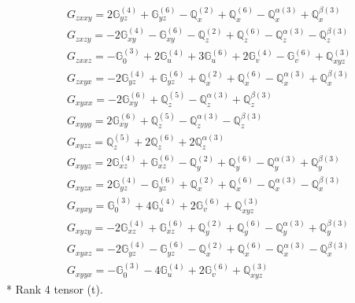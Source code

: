 \documentclass[fleqn,8pt,landscape]{jsarticle}
\begin{document}
\begin{align*}
& G_{zxxy} = 2 \mathbb{G}_{yz}^{(4)} + \mathbb{G}_{yz}^{(6)} - \mathbb{Q}_{x}^{(2)} + \mathbb{Q}_{x}^{(6)} - \mathbb{Q}_{x}^{\alpha(3)} + \mathbb{Q}_{x}^{\beta(3)} \\
& G_{zxzy} = - 2 \mathbb{G}_{xy}^{(4)} - \mathbb{G}_{xy}^{(6)} - \mathbb{Q}_{z}^{(2)} + \mathbb{Q}_{z}^{(6)} - \mathbb{Q}_{z}^{\alpha(3)} - \mathbb{Q}_{z}^{\beta(3)} \\
& G_{zxxz} = - \mathbb{G}_{0}^{(3)} + 2 \mathbb{G}_{u}^{(4)} + 3 \mathbb{G}_{u}^{(6)} + 2 \mathbb{G}_{v}^{(4)} - \mathbb{G}_{v}^{(6)} + \mathbb{Q}_{xyz}^{(3)} \\
& G_{zxyx} = - 2 \mathbb{G}_{yz}^{(4)} + \mathbb{G}_{yz}^{(6)} + \mathbb{Q}_{x}^{(2)} + \mathbb{Q}_{x}^{(6)} - \mathbb{Q}_{x}^{\alpha(3)} + \mathbb{Q}_{x}^{\beta(3)} \\
& G_{xyxx} = - 2 \mathbb{G}_{xy}^{(6)} + \mathbb{Q}_{z}^{(5)} - \mathbb{Q}_{z}^{\alpha(3)} + \mathbb{Q}_{z}^{\beta(3)} \\
& G_{xyyy} = 2 \mathbb{G}_{xy}^{(6)} + \mathbb{Q}_{z}^{(5)} - \mathbb{Q}_{z}^{\alpha(3)} - \mathbb{Q}_{z}^{\beta(3)} \\
& G_{xyzz} = \mathbb{Q}_{z}^{(5)} + 2 \mathbb{Q}_{z}^{(6)} + 2 \mathbb{Q}_{z}^{\alpha(3)} \\
& G_{xyyz} = 2 \mathbb{G}_{xz}^{(4)} + \mathbb{G}_{xz}^{(6)} - \mathbb{Q}_{y}^{(2)} + \mathbb{Q}_{y}^{(6)} - \mathbb{Q}_{y}^{\alpha(3)} + \mathbb{Q}_{y}^{\beta(3)} \\
& G_{xyzx} = 2 \mathbb{G}_{yz}^{(4)} - \mathbb{G}_{yz}^{(6)} + \mathbb{Q}_{x}^{(2)} + \mathbb{Q}_{x}^{(6)} - \mathbb{Q}_{x}^{\alpha(3)} - \mathbb{Q}_{x}^{\beta(3)} \\
& G_{xyxy} = \mathbb{G}_{0}^{(3)} + 4 \mathbb{G}_{u}^{(4)} + 2 \mathbb{G}_{v}^{(6)} + \mathbb{Q}_{xyz}^{(3)} \\
& G_{xyzy} = - 2 \mathbb{G}_{xz}^{(4)} + \mathbb{G}_{xz}^{(6)} + \mathbb{Q}_{y}^{(2)} + \mathbb{Q}_{y}^{(6)} - \mathbb{Q}_{y}^{\alpha(3)} + \mathbb{Q}_{y}^{\beta(3)} \\
& G_{xyxz} = - 2 \mathbb{G}_{yz}^{(4)} - \mathbb{G}_{yz}^{(6)} - \mathbb{Q}_{x}^{(2)} + \mathbb{Q}_{x}^{(6)} - \mathbb{Q}_{x}^{\alpha(3)} - \mathbb{Q}_{x}^{\beta(3)} \\
& G_{xyyx} = - \mathbb{G}_{0}^{(3)} - 4 \mathbb{G}_{u}^{(4)} + 2 \mathbb{G}_{v}^{(6)} + \mathbb{Q}_{xyz}^{(3)}
\end{align*}
* Rank 4 tensor (t).
\end{document}
